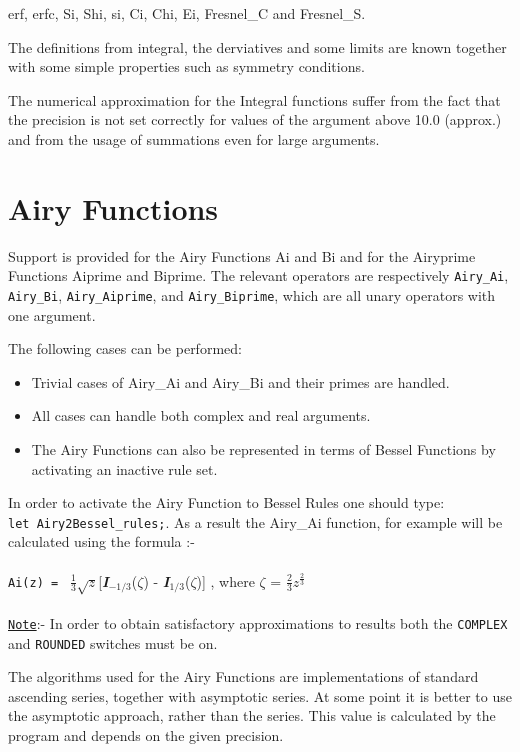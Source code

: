 erf, erfc, Si, Shi, si, Ci, Chi, Ei, Fresnel\_C and Fresnel\_S.

The definitions from integral, the derviatives and some limits are
known together with some simple properties such as symmetry
conditions.

The numerical approximation for the Integral functions suffer
from the fact that the precision is not set correctly for
values of the argument above 10.0 (approx.) and from the
usage of summations even for large arguments.

\section{Airy Functions}

Support is provided for the Airy Functions Ai and Bi and for the
Airyprime Functions Aiprime and Biprime. The relevant operators are
respectively {\tt Airy\_Ai}, {\tt Airy\_Bi}, {\tt Airy\_Aiprime}, and
{\tt Airy\_Biprime}, which are all unary operators with one argument.

The following cases can be performed:

\begin{itemize}
\item Trivial cases of Airy\_Ai and Airy\_Bi and their primes are handled.
\item All cases can handle both complex and real arguments.
\item The Airy Functions can also be represented in terms of Bessel
Functions by activating an inactive rule set.
\end{itemize}

In order to activate the Airy Function to Bessel Rules one should type: \\
{\tt let Airy2Bessel\_rules;}. As a result the Airy\_Ai function,
for example will be calculated using the formula :- \\
\\
{\tt Ai(z) = } $\frac{1}{3}$\( \sqrt{z} \)[{\bf {\sl I}}$_{-1/3}$($\zeta$)
- {\bf {\sl I}}$_{1/3}$({$\zeta$})] , where
 $\zeta$ =  $\frac{2}{3} z^{\frac{2}{3}}$\\
\\
\underline{{\tt Note}}:- In order to obtain satisfactory approximations
to results both the {\tt COMPLEX} and {\tt ROUNDED} switches must be on.

The algorithms used for the Airy Functions are implementations of
standard ascending series, together with asymptotic series. At some
point it is better to use the asymptotic approach, rather than the
series. This value is calculated by the program and depends on the given
precision.


